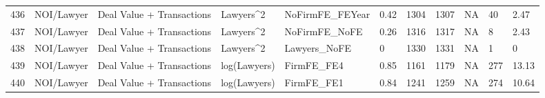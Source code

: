 \documentclass{article}
\begin{document}
\begin{table}[H]
\begin{tabular}{rllllllllll}
  436 & NOI/Lawyer & Deal Value + Transactions & Lawyers^2 & NoFirmFE\_FEYear & 0.42 & 1304 & 1307 & NA & 40 & 2.47 \\ 
  437 & NOI/Lawyer & Deal Value + Transactions & Lawyers^2 & NoFirmFE\_NoFE & 0.26 & 1316 & 1317 & NA & 8 & 2.43 \\ 
  438 & NOI/Lawyer & Deal Value + Transactions & Lawyers^2 & Lawyers\_NoFE & 0 & 1330 & 1331 & NA & 1 & 0 \\ 
  439 & NOI/Lawyer & Deal Value + Transactions & log(Lawyers) & FirmFE\_FE4 & 0.85 & 1161 & 1179 & NA & 277 & 13.13 \\ 
  440 & NOI/Lawyer & Deal Value + Transactions & log(Lawyers) & FirmFE\_FE1 & 0.84 & 1241 & 1259 & NA & 274 & 10.64 \\ 
   \hline
\end{tabular}
\end{table}
\end{document}
